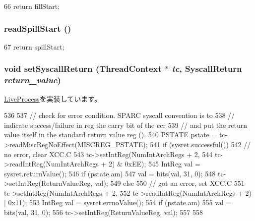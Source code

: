 \begin{DoxyCode}
66 { return fillStart; }
\end{DoxyCode}
\hypertarget{classSparcLiveProcess_ad091f71e79fb429f020a72b02b1b2b5a}{
\subsubsection[{readSpillStart}]{ readSpillStart ()}}
\label{classSparcLiveProcess_ad091f71e79fb429f020a72b02b1b2b5a}



\begin{DoxyCode}
67 { return spillStart; }
\end{DoxyCode}
\hypertarget{classSparcLiveProcess_aaefd02663c1eae206b851290d9276a5e}{
\subsubsection[{setSyscallReturn}]{\setlength{\rightskip}{0pt plus 5cm}void setSyscallReturn ({\bf ThreadContext} $\ast$ {\em tc}, \/  {\bf SyscallReturn} {\em return\_\-value})}}
\label{classSparcLiveProcess_aaefd02663c1eae206b851290d9276a5e}


\hyperlink{classLiveProcess_a5955e790542b86589b9fd75df24ec2d3}{LiveProcess}を実装しています。


\begin{DoxyCode}
536 {
537     // check for error condition.  SPARC syscall convention is to
538     // indicate success/failure in reg the carry bit of the ccr
539     // and put the return value itself in the standard return value reg ().
540     PSTATE pstate = tc->readMiscRegNoEffect(MISCREG_PSTATE);
541     if (sysret.successful()) {
542         // no error, clear XCC.C
543         tc->setIntReg(NumIntArchRegs + 2,
544                       tc->readIntReg(NumIntArchRegs + 2) & 0xEE);
545         IntReg val = sysret.returnValue();
546         if (pstate.am)
547             val = bits(val, 31, 0);
548         tc->setIntReg(ReturnValueReg, val);
549     } else {
550         // got an error, set XCC.C
551         tc->setIntReg(NumIntArchRegs + 2,
552                       tc->readIntReg(NumIntArchRegs + 2) | 0x11);
553         IntReg val = sysret.errnoValue();
554         if (pstate.am)
555             val = bits(val, 31, 0);
556         tc->setIntReg(ReturnValueReg, val);
557     }
558 }
\end{DoxyCode}


